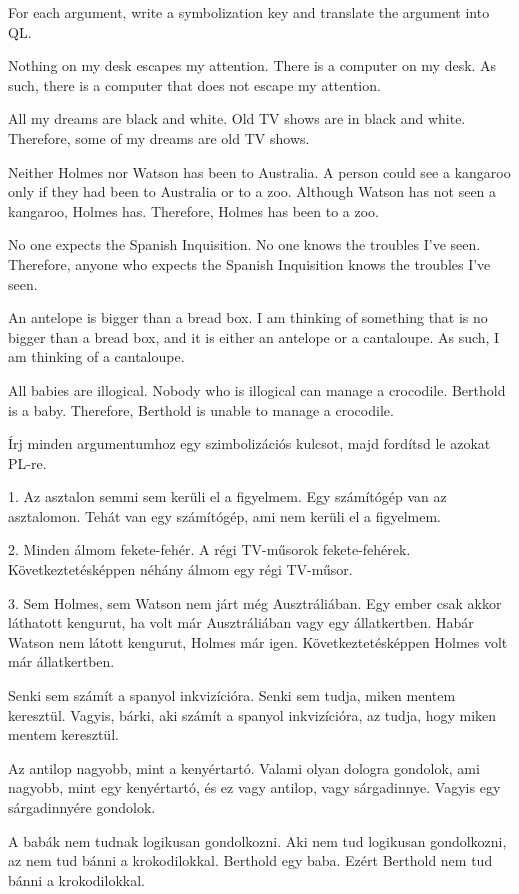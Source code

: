 \problempart
\label{pr.QLarguments}
For each argument, write a symbolization key and translate the argument into QL.
\begin{earg}
\item Nothing on my desk escapes my attention. There is a computer on my desk. As such, there is a computer that does not escape my attention.
\item All my dreams are black and white. Old TV shows are in black and white. Therefore, some of my dreams are old TV shows.
\item Neither Holmes nor Watson has been to Australia. A person could see a kangaroo only if they had been to Australia or to a zoo. Although Watson has not seen a kangaroo, Holmes has. Therefore, Holmes has been to a zoo.
\item No one expects the Spanish Inquisition. No one knows the troubles I've seen. Therefore, anyone who expects the Spanish Inquisition knows the troubles I've seen.
\item An antelope is bigger than a bread box. I am thinking of something that is no bigger than a bread box, and it is either an antelope or a cantaloupe. As such, I am thinking of a cantaloupe.
\item All babies are illogical. Nobody who is illogical can manage a crocodile. Berthold is a baby. Therefore, Berthold is unable to manage a crocodile.
\end{earg}

\problempart
\label{pr.QLarguments}
Írj minden argumentumhoz egy szimbolizációs kulcsot, majd fordítsd le azokat PL-re.
\begin{earg}
\item 1. Az asztalon semmi sem kerüli el a figyelmem. Egy számítógép van az asztalomon. Tehát van egy számítógép, ami nem kerüli el a figyelmem.
\item 2. Minden álmom fekete-fehér. A régi TV-műsorok fekete-fehérek. Következtetésképpen néhány álmom egy régi TV-műsor.
\item 3. Sem Holmes, sem Watson nem járt még Ausztráliában. Egy ember csak akkor láthatott kengurut, ha volt már Ausztráliában vagy egy állatkertben. Habár Watson nem látott kengurut, Holmes már igen. Következtetésképpen Holmes volt már állatkertben.
\item Senki sem számít a spanyol inkvizícióra. Senki sem tudja, miken mentem keresztül. Vagyis, bárki, aki számít a spanyol inkvizícióra, az tudja, hogy miken mentem keresztül.
\item Az antilop nagyobb, mint a kenyértartó. Valami olyan dologra gondolok, ami nagyobb, mint egy kenyértartó, és ez vagy antilop, vagy sárgadinnye. Vagyis egy sárgadinnyére gondolok.
\item A babák nem tudnak logikusan gondolkozni. Aki nem tud logikusan gondolkozni, az nem tud bánni a krokodilokkal. Berthold egy baba. Ezért Berthold nem tud bánni a krokodilokkal.
\end{earg}

